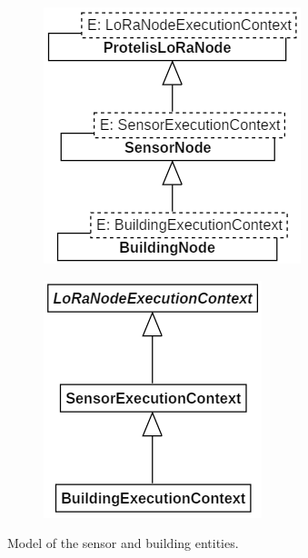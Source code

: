 \begin{figure}[h]
    \centering
    \begin{subfigure}{.495\textwidth}
        \centering
        \includegraphics{figures/NodeAC_caseStudy.png}
        \caption{}
        \label{fig:caseBmodel_a}
    \end{subfigure}
    \begin{subfigure}{.495\textwidth}
        \centering
        \includegraphics{figures/ECAC_caseStudy.png}
        \caption{}
        \label{fig:caseBmodel_b}
    \end{subfigure}
    \caption[Model of the sensor and building entities (case study 2)]{Model of the sensor and building entities.}
    \label{fig:caseBmodel}
\end{figure}

